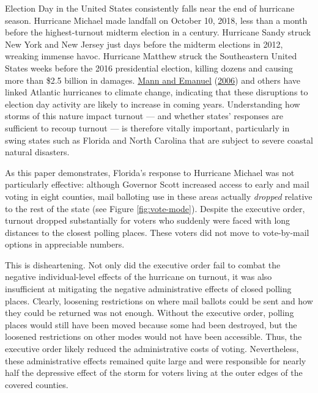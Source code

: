 \documentclass[
  12pt,
]{article}
\begin{document}
Election Day in the United States consistently falls near the end of hurricane season. Hurricane Michael made landfall on October 10, 2018, less than a month before the highest-turnout midterm election in a century. Hurricane Sandy struck New York and New Jersey just days before the midterm elections in 2012, wreaking immense havoc. Hurricane Matthew struck the Southeastern United States weeks before the 2016 presidential election, killing dozens and causing more than \$2.5 billion in damages. \protect\hyperlink{ref-Mann2006}{Mann and Emanuel} (\protect\hyperlink{ref-Mann2006}{2006}) and others have linked Atlantic hurricanes to climate change, indicating that these disruptions to election day activity are likely to increase in coming years. Understanding how storms of this nature impact turnout --- and whether states' responses are sufficient to recoup turnout --- is therefore vitally important, particularly in swing states such as Florida and North Carolina that are subject to severe coastal natural disasters.

As this paper demonstrates, Florida's response to Hurricane Michael was not particularly effective: although Governor Scott increased access to early and mail voting in eight counties, mail balloting use in these areas actually \emph{dropped} relative to the rest of the state (see Figure \ref{fig:vote-mode}). Despite the executive order, turnout dropped substantially for voters who suddenly were faced with long distances to the closest polling places. These voters did not move to vote-by-mail options in appreciable numbers.

This is disheartening. Not only did the executive order fail to combat the negative individual-level effects of the hurricane on turnout, it was also insufficient at mitigating the negative administrative effects of closed polling places. Clearly, loosening restrictions on where mail ballots could be sent and how they could be returned was not enough. Without the executive order, polling places would still have been moved because some had been destroyed, but the loosened restrictions on other modes would not have been accessible. Thus, the executive order likely reduced the administrative costs of voting. Nevertheless, these administrative effects remained quite large and were responsible for nearly half the depressive effect of the storm for voters living at the outer edges of the covered counties.
\end{document}
